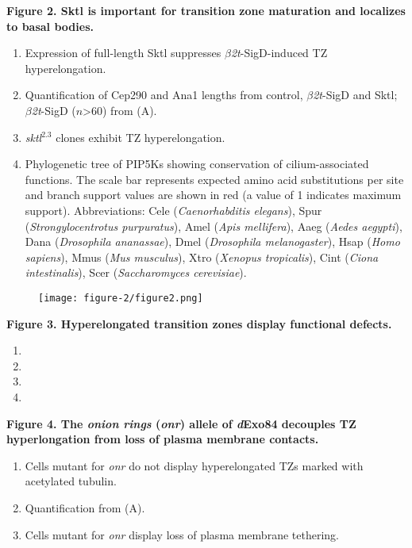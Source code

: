 \documentclass[12pt, twoside, letterpaper]{article}
\newcommand{\sigd}{$\beta$\textit{2t}-SigD}
\begin{document}
%
\textbf{Figure 2. Sktl is important for transition zone maturation and localizes to basal bodies.} 
\begin{enumerate}[label={(\Alph*)}, nolistsep]
\item Expression of full-length Sktl suppresses \sigd{}-induced TZ hyperelongation.
\item Quantification of Cep290 and Ana1 lengths from control, \sigd{} and Sktl; \sigd{} ($n$\textgreater 60) from (A).
\item \textit{sktl}$^{2.3}$ clones exhibit TZ hyperelongation.
\item Phylogenetic tree of PIP5Ks showing conservation of cilium-associated functions.
  The scale bar represents expected amino acid substitutions per site and branch support values are shown in red (a value of 1 indicates maximum support).
Abbreviations: Cele (\textit{Caenorhabditis elegans}), Spur (\textit{Strongylocentrotus purpuratus}), Amel (\textit{Apis mellifera}), Aaeg (\textit{Aedes aegypti}), Dana (\textit{Drosophila ananassae}), Dmel (\textit{Drosophila melanogaster}), Hsap (\textit{Homo sapiens}), Mmus (\textit{Mus musculus}), Xtro (\textit{Xenopus tropicalis}), Cint (\textit{Ciona intestinalis}), Scer (\textit{Saccharomyces cerevisiae}).
\end{enumerate}

\begin{figure}[ht]
  \texttt{[image: figure-2/figure2.png]}
\end{figure}
\newpage


%
\textbf{Figure 3. Hyperelongated transition zones display functional defects.}
\begin{enumerate}[label={(\Alph*)}, nolistsep]
\item
\item 
\item 
\item 
\end{enumerate}



\textbf{Figure 4. The \textit{onion rings} (\textit{onr}) allele of \textit{d}Exo84 decouples TZ hyperlongation from loss of plasma membrane contacts.}
\begin{enumerate}[label={(\Alph*)}, nolistsep]
\item Cells mutant for \textit{onr} do not display hyperelongated TZs marked with acetylated tubulin.
\item Quantification from (A).
\item Cells mutant for \textit{onr} display loss of plasma membrane tethering.
\end{enumerate}

\end{document}
